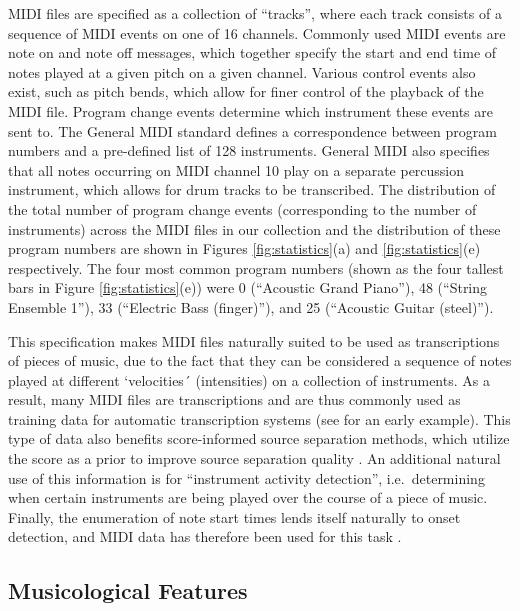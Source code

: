 \documentclass{article}
\begin{document}
MIDI files are specified as a collection of ``tracks'', where each track consists of a sequence of MIDI events on one of 16 channels.
Commonly used MIDI events are note on and note off messages, which together specify the start and end time of notes played at a given pitch on a given channel.
Various control events also exist, such as pitch bends, which allow for finer control of the playback of the MIDI file.
Program change events determine which instrument these events are sent to.
The General MIDI standard defines a correspondence between program numbers and a pre-defined list of 128 instruments.
General MIDI also specifies that all notes occurring on MIDI channel 10 play on a separate percussion instrument, which allows for drum tracks to be transcribed.
The distribution of the total number of program change events (corresponding to the number of instruments) across the MIDI files in our collection and the distribution of these program numbers are shown in Figures \ref{fig:statistics}(a) and \ref{fig:statistics}(e) respectively.
The four most common program numbers (shown as the four tallest bars in Figure \ref{fig:statistics}(e)) were 0 (``Acoustic Grand Piano''), 48 (``String Ensemble 1''), 33 (``Electric Bass (finger)''), and 25 (``Acoustic Guitar (steel)'').

This specification makes MIDI files naturally suited to be used as transcriptions of pieces of music, due to the fact that they can be considered a sequence of notes played at different `velocities´ (intensities) on a collection of instruments.
As a result, many MIDI files are transcriptions and are thus commonly used as training data for automatic transcription systems (see \cite{turetsky2003ground} for an early example).
This type of data also benefits score-informed source separation methods, which utilize the score as a prior to improve source separation quality \cite{ewert2014score}.
An additional natural use of this information is for ``instrument activity detection'', i.e.\ determining when certain instruments are being played over the course of a piece of music.
Finally, the enumeration of note start times lends itself naturally to onset detection, and MIDI data has therefore been used for this task \cite{bello2005tutorial}.

\subsection{Musicological Features}
\end{document}

